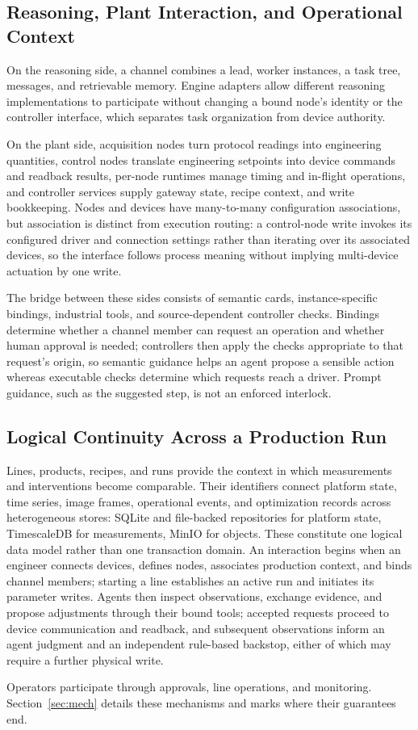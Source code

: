 \subsection{Reasoning, Plant Interaction, and Operational Context}
On the reasoning side, a channel combines a lead, worker instances, a task tree,
messages, and retrievable memory. Engine adapters allow different reasoning
implementations to participate without changing a bound node's identity or the
controller interface, which separates task organization from device authority.

On the plant side, acquisition nodes turn protocol readings into engineering
quantities, control nodes translate engineering setpoints into device commands and
readback results, per-node runtimes manage timing and in-flight operations, and
controller services supply gateway state, recipe context, and write bookkeeping.
Nodes and devices have many-to-many configuration associations, but association is
distinct from execution routing: a control-node write invokes its configured driver
and connection settings rather than iterating over its associated devices, so the
interface follows process meaning without implying multi-device actuation by one
write.

The bridge between these sides consists of semantic cards, instance-specific
bindings, industrial tools, and source-dependent controller checks. Bindings
determine whether a channel member can request an operation and whether human
approval is needed; controllers then apply the checks appropriate to that request's
origin, so semantic guidance helps an agent propose a sensible action whereas
executable checks determine which requests reach a driver. Prompt guidance, such as
the suggested step, is not an enforced interlock.

\subsection{Logical Continuity Across a Production Run}
Lines, products, recipes, and runs provide the context in which measurements and
interventions become comparable. Their identifiers connect platform state, time
series, image frames, operational events, and optimization records across
heterogeneous stores: SQLite and file-backed repositories for platform state,
TimescaleDB for measurements, MinIO for objects. These constitute one logical data
model rather than one transaction domain. An interaction begins when an engineer
connects devices, defines nodes, associates production context, and binds channel
members; starting a line establishes an active run and initiates its parameter
writes. Agents then inspect observations, exchange evidence, and propose adjustments
through their bound tools; accepted requests proceed to device communication and
readback, and subsequent observations inform an agent judgment and an
independent rule-based backstop, either of which may require a further physical
write.

Operators participate through approvals, line operations, and monitoring.
Section~\ref{sec:mech} details these mechanisms and marks where their guarantees
end.

